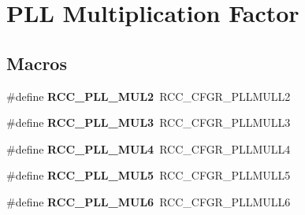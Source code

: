 \hypertarget{group___r_c_c_ex___p_l_l___multiplication___factor}{}\section{P\+LL Multiplication Factor}
\label{group___r_c_c_ex___p_l_l___multiplication___factor}
\subsection*{Macros}
\begin{DoxyCompactItemize}
\item 
\mbox{\label{group___r_c_c_ex___p_l_l___multiplication___factor_ga1ebc7b8473983247312ff095c242285f}} 
\#define {\bfseries R\+C\+C\+\_\+\+P\+L\+L\+\_\+\+M\+U\+L2}~R\+C\+C\+\_\+\+C\+F\+G\+R\+\_\+\+P\+L\+L\+M\+U\+L\+L2
\item 
\mbox{\label{group___r_c_c_ex___p_l_l___multiplication___factor_ga4ee529382af73885706795fd81538781}} 
\#define {\bfseries R\+C\+C\+\_\+\+P\+L\+L\+\_\+\+M\+U\+L3}~R\+C\+C\+\_\+\+C\+F\+G\+R\+\_\+\+P\+L\+L\+M\+U\+L\+L3
\item 
\mbox{\label{group___r_c_c_ex___p_l_l___multiplication___factor_ga2aedc8bc6552d98fb748b58a2379820b}} 
\#define {\bfseries R\+C\+C\+\_\+\+P\+L\+L\+\_\+\+M\+U\+L4}~R\+C\+C\+\_\+\+C\+F\+G\+R\+\_\+\+P\+L\+L\+M\+U\+L\+L4
\item 
\mbox{\label{group___r_c_c_ex___p_l_l___multiplication___factor_ga3b2b6019d1b1de880b009ff2a6769f03}} 
\#define {\bfseries R\+C\+C\+\_\+\+P\+L\+L\+\_\+\+M\+U\+L5}~R\+C\+C\+\_\+\+C\+F\+G\+R\+\_\+\+P\+L\+L\+M\+U\+L\+L5
\item 
\mbox{\label{group___r_c_c_ex___p_l_l___multiplication___factor_gae2f8dd748556470dcac6901ac7a3e650}} 
\#define {\bfseries R\+C\+C\+\_\+\+P\+L\+L\+\_\+\+M\+U\+L6}~R\+C\+C\+\_\+\+C\+F\+G\+R\+\_\+\+P\+L\+L\+M\+U\+L\+L6
\item 
\mbox{\label{group___r_c_c_ex___p_l_l___multiplication___factor_gae215b8ba691fe0ea413c45d56e77eca0}} 

\end{DoxyCompactItemize}
